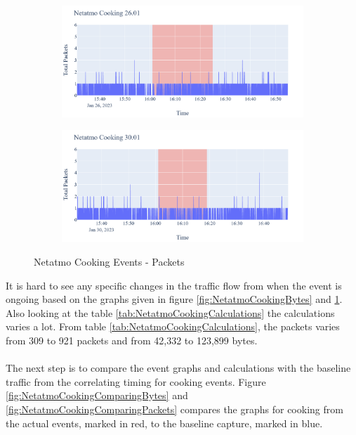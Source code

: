 \begin{figure}[H]
\begin{subfigure}[b]{0.5\textwidth}
    \end{subfigure}
    \begin{subfigure}[b]{0.5\textwidth}
        \centering
        \includegraphics[width=1.2\hsize]{figures/Netatmo_Cooking_Packets_26.01.png}
    \end{subfigure}
    \begin{subfigure}[b]{0.5\textwidth}
        \centering
        \includegraphics[width=1.2\hsize]{figures/Netatmo_Cooking_Packets_30.01.png}
    \end{subfigure}
    \caption{Netatmo Cooking Events - Packets}
    \label{fig:NetatmoCookingPackets}
\end{figure}

It is hard to see any specific changes in the traffic flow from when the event is ongoing based on the graphs given in figure \ref{fig:NetatmoCookingBytes} and \ref{fig:NetatmoCookingPackets}. Also looking at the table \ref{tab:NetatmoCookingCalculations} the calculations varies a lot. From table \ref{tab:NetatmoCookingCalculations}, the packets varies from 309 to 921 packets and from 42,332 to 123,899 bytes. 
\\\\
The next step is to compare the event graphs and calculations with the baseline traffic from the correlating timing for cooking events. Figure \ref{fig:NetatmoCookingComparingBytes} and \ref{fig:NetatmoCookingComparingPackets} compares the graphs for cooking from the actual events, marked in red, to the baseline capture, marked in blue. 

